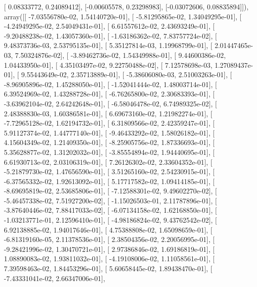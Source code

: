 \documentclass{article}
\begin{document}
       [ 0.08333772,  0.24089412],
       [-0.00605578,  0.23298983],
       [-0.03072606,  0.08835894]]), array([[ -7.03556780e-02,   1.54140720e-01],
       [ -5.81295865e-02,   1.34049295e-01],
       [ -4.24949295e-02,   2.54049431e-01],
       [  6.61557612e-02,   2.43693249e-01],
       [ -9.20488238e-02,   1.43057360e-01],
       [ -1.63186362e-02,   7.83757724e-02],
       [  9.48373736e-03,   2.53795135e-01],
       [  5.35127814e-03,   1.19968799e-01],
       [  2.01447465e-03,   7.50324876e-02],
       [ -3.89462736e-02,   1.54349988e-01],
       [  9.44600386e-02,   1.04433950e-01],
       [  4.35103497e-02,   9.22750488e-02],
       [  7.12578698e-03,   1.27089437e-01],
       [  9.55443649e-02,   2.35713889e-01],
       [ -5.38606080e-03,   2.51003263e-01],
       [ -8.96905896e-02,   1.45288050e-01],
       [ -1.52041444e-02,   1.48003714e-01],
       [  6.39524969e-02,   1.43288728e-01],
       [ -6.76265800e-02,   2.30683393e-01],
       [ -3.63962104e-02,   2.64242648e-01],
       [ -6.58046478e-02,   6.74989325e-02],
       [  2.48388830e-03,   1.60386581e-01],
       [  6.69673160e-02,   1.21982274e-01],
       [ -7.72965128e-02,   1.62194732e-01],
       [  6.31809566e-02,   2.42359247e-01],
       [  5.91127374e-02,   1.44777140e-01],
       [ -9.46433292e-02,   1.58026182e-01],
       [  4.15604349e-02,   1.21409350e-01],
       [ -8.25905756e-02,   1.87336693e-01],
       [  5.35628877e-02,   1.31202032e-01],
       [ -3.85554894e-02,   1.94440695e-01],
       [  6.61930713e-02,   2.03106319e-01],
       [  7.26126302e-02,   2.33604352e-01],
       [ -5.21879730e-02,   1.47656590e-01],
       [  3.51265160e-02,   2.54230915e-01],
       [ -6.37565332e-02,   1.92613092e-01],
       [  5.17717582e-02,   1.09414185e-01],
       [ -8.69695819e-02,   2.53685806e-01],
       [ -7.12588301e-02,   9.49602270e-02],
       [ -5.46457338e-02,   7.51927200e-02],
       [ -1.15026503e-01,   2.11787896e-01],
       [ -3.87640446e-02,   7.88417033e-02],
       [ -6.07134158e-02,   1.62168850e-01],
       [ -1.03213771e-01,   2.12596410e-01],
       [ -4.98186824e-02,   9.43762542e-02],
       [  6.92138885e-02,   1.94017646e-01],
       [  4.75388808e-02,   1.65098659e-01],
       [ -6.81319160e-05,   2.11378536e-01],
       [  2.38504356e-02,   2.20056995e-01],
       [ -9.28421996e-02,   1.30470721e-01],
       [  2.97386846e-02,   1.69186819e-01],
       [  1.08890083e-02,   1.93811032e-01],
       [ -4.19108006e-02,   1.11058561e-01],
       [  7.39598463e-02,   1.84453296e-01],
       [  5.60658445e-02,   1.89438470e-01],
       [ -7.43331041e-02,   2.66347006e-01],
\end{document}
